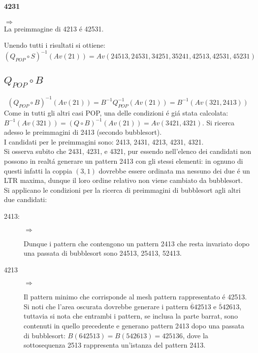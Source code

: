 \paragraph*{4231}\begin{center}$\Rightarrow$\\La preimmagine di 4213 \'e 42531.\end{center}
Unendo tutti i risultati si ottiene:$$(Q_{POP}\circ{S})^{-1}(Av(21)) = Av(24513, 24531, 34251, 35241, 42513, 42531, 45231)$$
\subsection*{$Q_{POP}\circ{B}$}
$$(Q_{POP}\circ{B})^{-1}(Av(21)) = B^{-1}Q_{POP}^{-1}(Av(21))=B^{-1}(Av(321,2413))$$
Come in tutti gli altri casi POP, una delle condizioni \'e gi\'a stata calcolata: $B^{-1}(Av(321))=(Q\circ{B})^{-1}(Av(21))=Av(3421,4321)$. Si ricerca adesso le preimmagini di 2413 (secondo bubblesort).\\
I candidati per le preimmagini sono: 2413, 2431, 4213, 4231, 4321.\\
Si osserva subito che 2431, 4231, e 4321, pur essendo nell'elenco dei candidati non possono in realt\'a generare un pattern 2413 con gli stessi elementi: in ognuno di questi infatti la coppia $(3,1)$ dovrebbe essere ordinata ma nessuno dei due \'e un LTR maxima, dunque il loro ordine relativo non viene cambiato da bubblesort.\\
Si applicano le condizioni per la ricerca di preimmagini di bubblesort agli altri due candidati:
\begin{description}
	\item[2413:]\begin{center}$\Rightarrow$\end{center}
	Dunque i pattern che contengono un pattern 2413 che resta invariato dopo una passata di bubblesort sono 24513, 25413, 52413.
	\item[4213]\begin{center}$\Rightarrow$\end{center}
	Il pattern minimo che corrisponde al mesh pattern rappresentato \'e 42513.\\
	Si noti che l'area oscurata dovrebbe generare i pattern $\overline{6}42513$ e $\overline{5}42613$, tuttavia si nota che entrambi i pattern, se inclusa la parte barrat, sono contenuti in quello precedente e generano pattern 2413 dopo una passata di bubblesort: $B(642513) = B(542613) =425136$, dove la sottosequenza 2513 rappresenta un'istanza del pattern 2413.
\end{description}
